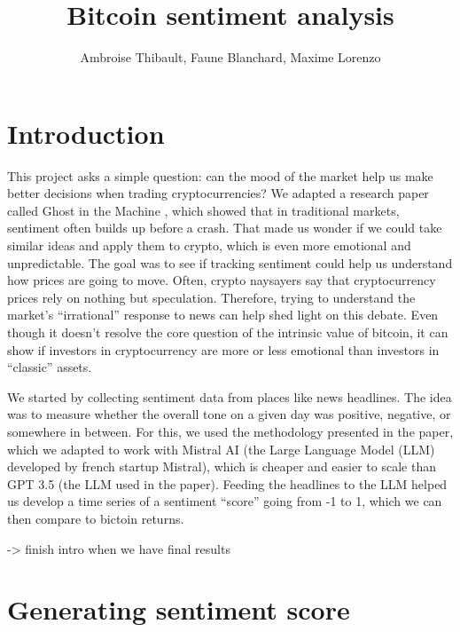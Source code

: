 \documentclass[
  a4paper]{article}
\title{Bitcoin sentiment analysis}
\author{Ambroise Thibault, Faune Blanchard, Maxime Lorenzo}
\date{}
\renewcommand*\contentsname{Table of contents}
\newcommand\contentsname{Table of contents}
\begin{document}
\maketitle
\ifdefined\Shaded\renewenvironment{Shaded}{\begin{tcolorbox}[boxrule=0pt, interior hidden, breakable, frame hidden, enhanced, borderline west={3pt}{0pt}{shadecolor}, sharp corners]}{\end{tcolorbox}}\fi

\renewcommand*\contentsname{Table of contents}
{
\hypersetup{linkcolor=}
\setcounter{tocdepth}{4}
\tableofcontents
}
\hypertarget{introduction}{%
\section{Introduction}\label{introduction}}

This project asks a simple question: can the mood of the market help us
make better decisions when trading cryptocurrencies? We adapted a
research paper called Ghost in the Machine \textcite{leland_bybee_2025},
which showed that in traditional markets, sentiment often builds up
before a crash. That made us wonder if we could take similar ideas and
apply them to crypto, which is even more emotional and unpredictable.
The goal was to see if tracking sentiment could help us understand how
prices are going to move. Often, crypto naysayers say that
cryptocurrency prices rely on nothing but speculation. Therefore, trying
to understand the market's ``irrational'' response to news can help shed
light on this debate. Even though it doesn't resolve the core question
of the intrinsic value of bitcoin, it can show if investors in
cryptocurrency are more or less emotional than investors in ``classic''
assets.

We started by collecting sentiment data from places like news headlines.
The idea was to measure whether the overall tone on a given day was
positive, negative, or somewhere in between. For this, we used the
methodology presented in the paper, which we adapted to work with
Mistral AI (the Large Language Model (LLM) developed by french startup
Mistral), which is cheaper and easier to scale than GPT 3.5 (the LLM
used in the paper). Feeding the headlines to the LLM helped us develop a
time series of a sentiment ``score'' going from -1 to 1, which we can
then compare to bictoin returns.

-\textgreater{} finish intro when we have final results

\hypertarget{generating-sentiment-score}{%
\section{Generating sentiment score}\label{generating-sentiment-score}}
\end{document}
